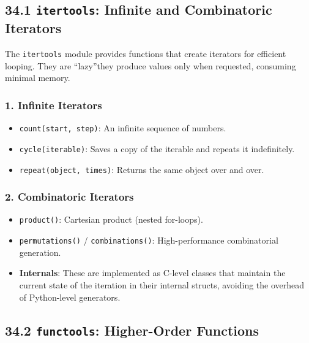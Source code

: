 \hypertarget{itertools-infinite-and-combinatoric-iterators}{%
\subsection{\texorpdfstring{34.1 \texttt{itertools}: Infinite and
Combinatoric
Iterators}{34.1 itertools: Infinite and Combinatoric Iterators}}\label{itertools-infinite-and-combinatoric-iterators}}

The \passthrough{\lstinline!itertools!} module provides functions that
create iterators for efficient looping. They are ``lazy''they produce
values only when requested, consuming minimal memory.

\hypertarget{infinite-iterators}{%
\subsubsection{1. Infinite Iterators}\label{infinite-iterators}}

\begin{itemize}
\tightlist
\item
  \passthrough{\lstinline!count(start, step)!}: An infinite sequence of
  numbers.
\item
  \passthrough{\lstinline!cycle(iterable)!}: Saves a copy of the
  iterable and repeats it indefinitely.
\item
  \passthrough{\lstinline!repeat(object, times)!}: Returns the same
  object over and over.
\end{itemize}

\hypertarget{combinatoric-iterators}{%
\subsubsection{2. Combinatoric Iterators}\label{combinatoric-iterators}}

\begin{itemize}
\tightlist
\item
  \passthrough{\lstinline!product()!}: Cartesian product (nested
  for-loops).
\item
  \passthrough{\lstinline!permutations()!} /
  \passthrough{\lstinline!combinations()!}: High-performance
  combinatorial generation.
\item
  \textbf{Internals}: These are implemented as C-level classes that
  maintain the current state of the iteration in their internal structs,
  avoiding the overhead of Python-level generators.
\end{itemize}

\hypertarget{functools-higher-order-functions}{%
\subsection{\texorpdfstring{34.2 \texttt{functools}: Higher-Order
Functions}{34.2 functools: Higher-Order Functions}}\label{functools-higher-order-functions}}

